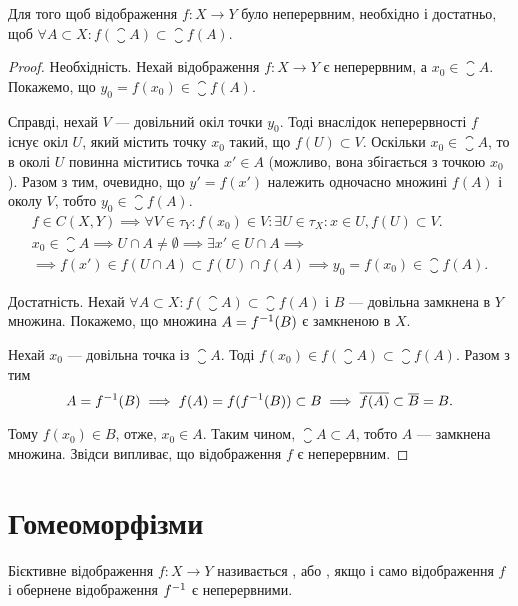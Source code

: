 \begin{theorem}
Для того щоб відображення $f: X \to Y$
було неперервним, необхідно і достатньо, щоб
$\forall A \subset X: f(\closure{A}) \subset \closure{f(A)}$.
\end{theorem}

\begin{proof}
Необхідність. Нехай відображення $f: X \to Y$ є неперервним, а $x_0 \in \closure{A}$.
Покажемо, що $y_0 = f(x_0) \in \closure{f(A)}$.

Справді, нехай $V$ --- довільний окіл точки $y_0$. Тоді внаслідок неперервності $f$
існує окіл $U$, який містить точку $x_0$ такий, що $f(U) \subset V$. Оскільки
$x_0 \in \closure{A}$, то в околі $U$ повинна міститись точка $x' \in A$
(можливо, вона збігається з точкою $x_0$). Разом з тим, очевидно, що $y' = f(x')$
належить одночасно множині $f(A)$ і околу $V$, тобто $y_0 \in \closure{f(A)}$.
\begin{multline*}
f \in C(X, Y) \implies \forall V \in \tau_Y: f(x_0) \in V: \exists U \in \tau_X: x \in U, f(U) \subset V. \\
x_0 \in \closure{A} \implies U \cap A \ne \emptyset \implies \exists x' \in U \cap A \implies \\
\implies f(x') \in f(U \cap A) \subset f(U) \cap f(A) \implies y_0 = f(x_0) \in \closure{f(A)}.
\end{multline*}

Достатність. Нехай $\forall A \subset X: f(\closure{A}) \subset \closure{f(A)}$
і $B$ --- довільна замкнена в $Y$ множина. Покажемо, що множина $A = f^{-1}(B)$
є замкненою в $X$.

Нехай $x_0$ --- довільна точка із $\closure{A}$.
Тоді $f(x_0) \in f(\closure{A}) \subset \closure{f(A)}$. Разом з тим
\[ A = f^{-1}(B) \implies f(A) = f(f^{-1}(B)) \subset B \implies \overline{f(A)} \subset \overline{B} = B. \]

Тому $f(x_0) \in B$, отже, $x_0 \in A$. Таким чином, $\closure{A} \subset A$, тобто
$A$ --- замкнена множина. Звідси випливає, що відображення $f$ є неперервним.
\end{proof}

\section{Гомеоморфізми}

\begin{definition}
Бієктивне відображення $f: X \to Y$
називається , або , якщо і
само відображення $f$ і обернене відображення $f^{-1} $ є неперервними.
\end{definition}

